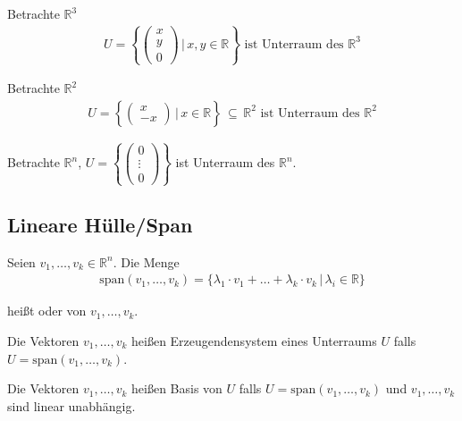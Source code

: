 Betrachte $\mathbb{R}^3$
\begin{align*}
	U = \left\{\begin{pmatrix}x \\ y \\ 0\end{pmatrix}\,\Bigg|\,x,y \in \mathbb{R}\right\}\text{ ist Unterraum des }\mathbb{R}^3
\end{align*}

Betrachte $\mathbb{R}^2$
\begin{align*}
	U = \left\{\begin{pmatrix}x \\ -x\end{pmatrix}\,\Bigg|\,x \in \mathbb{R}\right\}\,\subseteq\,\mathbb{R}^2\text{ ist Unterraum des }\mathbb{R}^2
\end{align*}

\begin{center}
\end{center}

Betrachte $\mathbb{R}^n$, $U = \left\{\begin{pmatrix}0 \\ \vdots \\ 0\end{pmatrix}\right\}$ ist Unterraum des $\mathbb{R}^n$.

\subsection{Lineare Hülle/Span}
Seien $v_1,\dots,v_k \in \mathbb{R}^n$. Die Menge
\begin{align*}
	\text{span}(v_1,\dots,v_k) = \{\lambda _1 \cdot v_1+\dots+\lambda _k \cdot v_k\,|\,\lambda _i \in \mathbb{R}\}
\end{align*}

heißt  oder  von $v_1,\dots,v_k$.

Die Vektoren $v_1,\dots,v_k$ heißen Erzeugendensystem eines Unterraums $U$ falls $U = \text{span}(v_1,\dots,v_k)$.

Die Vektoren $v_1,\dots,v_k$ heißen Basis von $U$ falls $U = \text{span}(v_1,\dots,v_k)$ und $v_1,\dots,v_k$ sind linear unabhängig.
